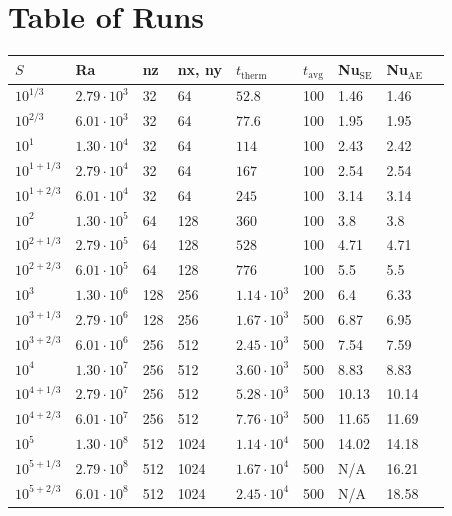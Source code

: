 \documentclass[aps, pre, onecolumn, nofootinbib, notitlepage, groupedaddress, amsfonts, amssymb, amsmath, longbibliography]{revtex4-1}
\begin{document}
\section{Table of Runs}
\label{appendix:run_table}
\begin{center}
\begin{tabularx}{\textwidth}{ X X X X X X X X X }
\hline															
$S$	&	Ra	&	nz	&	nx, ny	&	$t_{\text{therm}}$	&	$t_{\text{avg}}$	&	Nu$_{\text{SE}}$	&	Nu$_{\text{AE}}$	\\
\hline															
$10^{1/3}$	&	$2.79 \cdot 10^3$	&	32	&	64	&	$52.8$	&	100	&	1.46	&	1.46	\\
$10^{2/3}$	&	$6.01 \cdot 10^3$	&	32	&	64	&	$77.6$	&	100	&	1.95	&	1.95	\\
$10^1$	&	$1.30 \cdot 10^4$	&	32	&	64	&	$114$	&	100	&	2.43	&	2.42	\\
$10^{1 + 1/3}$	&	$2.79 \cdot 10^4$	&	32	&	64	&	$167$	&	100	&	2.54	&	2.54	\\
$10^{1 + 2/3}$	&	$6.01 \cdot 10^4$	&	32	&	64	&	$245$	&	100	&	3.14	&	3.14	\\
$10^2$	&	$1.30 \cdot 10^5$	&	64	&	128	&	$360$	&	100	&	3.8	&	3.8	\\
$10^{2 + 1/3}$	&	$2.79 \cdot 10^5$	&	64	&	128	&	$528$	&	100	&	4.71	&	4.71	\\
$10^{2 + 2/3}$	&	$6.01 \cdot 10^5$	&	64	&	128	&	$776$	&	100	&	5.5	&	5.5	\\
$10^3$	&	$1.30 \cdot 10^6$	&	128	&	256	&	$1.14 \cdot 10^3$	&	200	&	6.4	&	6.33	\\
$10^{3 + 1/3}$	&	$2.79 \cdot 10^6$	&	128	&	256	&	$1.67 \cdot 10^3$	&	500	&	6.87	&	6.95	\\
$10^{3 + 2/3}$	&	$6.01 \cdot 10^6$	&	256	&	512	&	$2.45 \cdot 10^3$	&	500	&	7.54	&	7.59	\\
$10^4$	&	$1.30 \cdot 10^7$	&	256	&	512	&	$3.60 \cdot 10^3$	&	500	&	8.83	&	8.83	\\
$10^{4 + 1/3}$	&	$2.79 \cdot 10^7$	&	256	&	512	&	$5.28 \cdot 10^3$	&	500	&	10.13	&	10.14	\\
$10^{4 + 2/3}$	&	$6.01 \cdot 10^7$	&	256	&	512	&	$7.76 \cdot 10^3$	&	500	&	11.65	&	11.69	\\
$10^5$	&	$1.30 \cdot 10^8$	&	512	&	1024	&	$1.14 \cdot 10^4$	&	500	&	14.02	&	14.18	\\
$10^{5 + 1/3}$	&	$2.79 \cdot 10^8$	&	512	&	1024	&	$1.67 \cdot 10^4$	&	500	&	N/A	&	16.21	\\
$10^{5 + 2/3}$	&	$6.01 \cdot 10^8$	&	512	&	1024	&	$2.45 \cdot 10^4$	&	500	&	N/A	&	18.58	\\

\end{tabularx}
\end{center}
\end{document}
